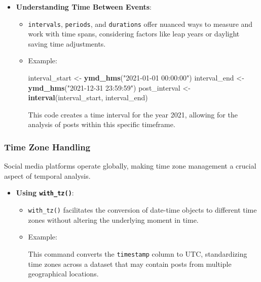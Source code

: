 \documentclass[
]{book}
\newenvironment{Shaded}{\begin{snugshade}}{\end{snugshade}}
\newcommand{\FunctionTok}[1]{\textcolor[rgb]{0.13,0.29,0.53}{\textbf{#1}}}
\newcommand{\NormalTok}[1]{#1}
\newcommand{\OtherTok}[1]{\textcolor[rgb]{0.56,0.35,0.01}{#1}}
\newcommand{\SpecialCharTok}[1]{\textcolor[rgb]{0.81,0.36,0.00}{\textbf{#1}}}
\newcommand{\StringTok}[1]{\textcolor[rgb]{0.31,0.60,0.02}{#1}}
\providecommand{\tightlist}{%
  \setlength{\itemsep}{0pt}\setlength{\parskip}{0pt}}
\begin{document}
\begin{itemize}
\tightlist
\item
  \textbf{Understanding Time Between Events}:

  \begin{itemize}
  \item
    \texttt{intervals}, \texttt{periods}, and \texttt{durations} offer nuanced ways to measure and work with time spans, considering factors like leap years or daylight saving time adjustments.
  \item
    Example:

\begin{Shaded}
\begin{Highlighting}[]
\NormalTok{interval\_start }\OtherTok{\textless{}{-}} \FunctionTok{ymd\_hms}\NormalTok{(}\StringTok{"2021{-}01{-}01 00:00:00"}\NormalTok{)}
\NormalTok{interval\_end }\OtherTok{\textless{}{-}} \FunctionTok{ymd\_hms}\NormalTok{(}\StringTok{"2021{-}12{-}31 23:59:59"}\NormalTok{)}
\NormalTok{post\_interval }\OtherTok{\textless{}{-}} \FunctionTok{interval}\NormalTok{(interval\_start, interval\_end)}
\end{Highlighting}
\end{Shaded}

    This code creates a time interval for the year 2021, allowing for the analysis of posts within this specific timeframe.
  \end{itemize}
\end{itemize}

\hypertarget{time-zone-handling}{%
\subsubsection{Time Zone Handling}\label{time-zone-handling}}

Social media platforms operate globally, making time zone management a crucial aspect of temporal analysis.

\begin{itemize}
\tightlist
\item
  \textbf{Using \texttt{with\_tz()}}:

  \begin{itemize}
  \item
    \texttt{with\_tz()} facilitates the conversion of date-time objects to different time zones without altering the underlying moment in time.
  \item
    Example:

\begin{Shaded}
\end{Shaded}

    This command converts the \texttt{timestamp} column to UTC, standardizing time zones across a dataset that may contain posts from multiple geographical locations.
  \end{itemize}
\end{itemize}
\end{document}
